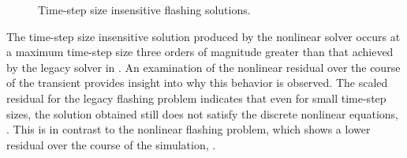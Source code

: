 \begin{figure}[h!t]
\centering
{}
\caption{Time-step size insensitive flashing solutions.}
\label{fig:flashing_res_comp_1}
\end{figure}

The time-step size insensitive solution produced by the nonlinear solver occurs at a maximum time-step size three orders of magnitude greater than that achieved by the legacy solver in \cobra{}.
An examination of the nonlinear residual over the course of the transient provides insight into why this behavior is observed.
The scaled residual for the legacy flashing problem indicates that even for small time-step sizes, the solution obtained still does not satisfy the discrete nonlinear equations, .
This is in contrast to the nonlinear flashing problem, which shows a lower residual over the course of the simulation, .

